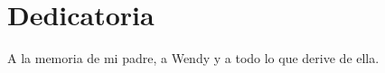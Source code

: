 \chapter*{Dedicatoria}
\begin{flushright} A la memoria de mi padre, a Wendy y a todo lo que derive de ella. \end{flushright}
